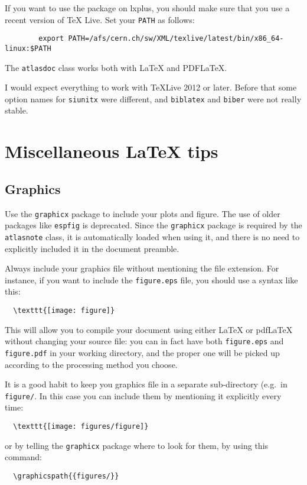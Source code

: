 \documentclass[koma,UKenglish]{style/atlasdoc}
\begin{document}
If you want to use the package on lxplus, you should make sure that you use a recent version of TeX Live.
Set your \texttt{PATH} as follows:
\begin{verbatim}
		export PATH=/afs/cern.ch/sw/XML/texlive/latest/bin/x86_64-linux:$PATH
\end{verbatim}

The \texttt{atlasdoc} class works both with \LaTeX{} and PDF\LaTeX{}.

I would expect everything to work with TeXLive 2012 or later.
Before that some option names for \texttt{siunitx} were different, and \texttt{biblatex} and \texttt{biber}
were not really stable.


\section{Miscellaneous \LaTeX{} tips}
\label{sec:latex}

\subsection{Graphics}

Use the {\tt graphicx} package \cite{} to include your plots and
figure. The use of older packages like {\tt espfig} is deprecated.
Since the {\tt graphicx} package is required by the {\tt atlasnote}
class, it is automatically loaded when using it, and there is no need
to explicitly included it in the document preamble.

Always include your graphics file without mentioning the file
extension. For instance, if you want to include the \texttt{figure.eps}
file, you should use a syntax like this:
\begin{verbatim}
  \texttt{[image: figure]}
\end{verbatim}
This will allow you to compile your document using either \LaTeX{} or
pdf\LaTeX{} without changing your source file: you can in fact have
both \texttt{figure.eps} and \texttt{figure.pdf} in your working directory,
and the proper one will be picked up according to the processing method
you choose.

It is a good habit to keep you graphics file in a separate
sub-directory (e.g.\ in \texttt{figure/}. In this case you can include them
by mentioning it explicitly every time:
\begin{verbatim}
  \texttt{[image: figures/figure]}
\end{verbatim}
or by telling the \texttt{graphicx} package where to look
for them, by using this command:
\begin{verbatim}
  \graphicspath{{figures/}}
\end{verbatim}
\end{document}
